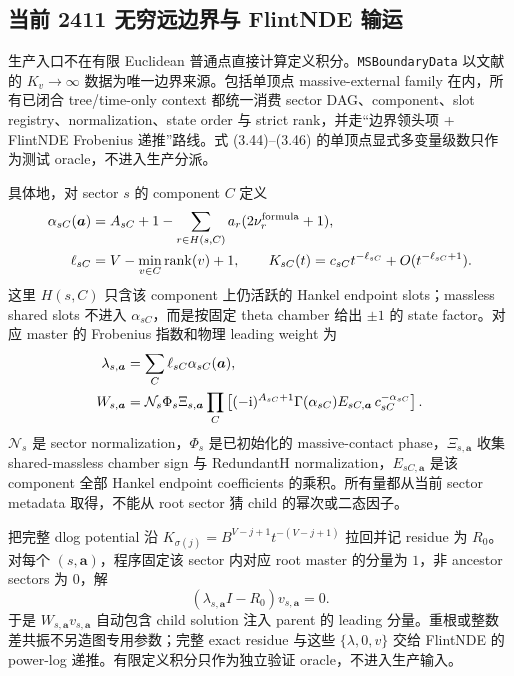 \documentclass[11pt,a4paper]{ctexart}
\newcommand{\ii}{\mathrm i}
\newcommand{\cN}{\mathcal N}
\begin{document}
\subsection{当前 2411 无穷远边界与 FlintNDE 输运}

生产入口不在有限 Euclidean 普通点直接计算定义积分。\texttt{MSBoundaryData} 以文献 \cite{Chen:2024jms} 的 $K_v\to\infty$ 数据为唯一边界来源。包括单顶点 massive-external family 在内，所有已闭合 tree/time-only context 都统一消费 sector DAG、component、slot registry、normalization、state order 与 strict rank，并走“边界领头项 + FlintNDE Frobenius 递推”路线。式 (3.44)--(3.46) 的单顶点显式多变量级数只作为测试 oracle，不进入生产分派。

具体地，对 sector $s$ 的 component $C$ 定义
\begin{align}
 \alpha_{sC}(\bm a)&=A_{sC}+1-
 \sum_{r\in H(s,C)}a_r(2\nu_r^{\rm formula}+1),
 \notag\\
 \ell_{sC}&=V-\min_{v\in C}\operatorname{rank}(v)+1,
 \qquad
 K_{sC}(t)=c_{sC}t^{-\ell_{sC}}+O(t^{-\ell_{sC}+1}).
 \label{eq:generic-sector-boundary-component}
\end{align}
这里 $H(s,C)$ 只含该 component 上仍活跃的 Hankel endpoint slots；massless shared slots 不进入 $\alpha_{sC}$，而是按固定 theta chamber 给出 $\pm1$ 的 state factor。对应 master 的 Frobenius 指数和物理 leading weight 为
\begin{align}
 \lambda_{s,\bm a}&=\sum_C\ell_{sC}\alpha_{sC}(\bm a),
 \notag\\
 W_{s,\bm a}&=\cN_s\Phi_s\Xi_{s,\bm a}
 \prod_C\left[
 (-\ii)^{A_{sC}+1}\Gamma(\alpha_{sC})
 E_{sC,\bm a}\,c_{sC}^{-\alpha_{sC}}
 \right].
 \label{eq:generic-sector-boundary-weight}
\end{align}
$\cN_s$ 是 sector normalization，$\Phi_s$ 是已初始化的 massive-contact phase，$\Xi_{s,\bm a}$ 收集 shared-massless chamber sign 与 RedundantH normalization，$E_{sC,\bm a}$ 是该 component 全部 Hankel endpoint coefficients 的乘积。所有量都从当前 sector metadata 取得，不能从 root sector 猜 child 的幂次或二态因子。

把完整 dlog potential 沿 $K_{\sigma(j)}=B^{V-j+1}t^{-(V-j+1)}$ 拉回并记 residue 为 $R_0$。对每个 $(s,\bm a)$，程序固定该 sector 内对应 root master 的分量为 $1$，非 ancestor sectors 为 $0$，解
\begin{equation}
 (\lambda_{s,\bm a}I-R_0)v_{s,\bm a}=0.
 \label{eq:generic-sector-indicial-vector}
\end{equation}
于是 $W_{s,\bm a}v_{s,\bm a}$ 自动包含 child solution 注入 parent 的 leading 分量。重根或整数差共振不另造图专用参数；完整 exact residue 与这些 $\{\lambda,0,v\}$ 交给 FlintNDE 的 power-log 递推。有限定义积分只作为独立验证 oracle，不进入生产输入。
\end{document}
